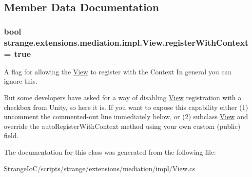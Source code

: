 \subsection{Member Data Documentation}
\hypertarget{classstrange_1_1extensions_1_1mediation_1_1impl_1_1_view_ad18a42c98cf565dcfae8f7444213fd71}{
\subsubsection[{register\-With\-Context}]{\setlength{\rightskip}{0pt plus 5cm}bool strange.\-extensions.\-mediation.\-impl.\-View.\-register\-With\-Context = true\hspace{0.3cm}{\ttfamily [protected]}}}\label{classstrange_1_1extensions_1_1mediation_1_1impl_1_1_view_ad18a42c98cf565dcfae8f7444213fd71}


A flag for allowing the \hyperlink{classstrange_1_1extensions_1_1mediation_1_1impl_1_1_view}{View} to register with the Context In general you can ignore this. 

But some developers have asked for a way of disabling \hyperlink{classstrange_1_1extensions_1_1mediation_1_1impl_1_1_view}{View} registration with a checkbox from Unity, so here it is. If you want to expose this capability either (1) uncomment the commented-\/out line immediately below, or (2) subclass \hyperlink{classstrange_1_1extensions_1_1mediation_1_1impl_1_1_view}{View} and override the auto\-Register\-With\-Context method using your own custom (public) field. 

The documentation for this class was generated from the following file\-:\begin{DoxyCompactItemize}
\item 
Strange\-Io\-C/scripts/strange/extensions/mediation/impl/View.\-cs\end{DoxyCompactItemize}
